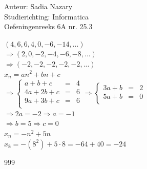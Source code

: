 \documentclass[a4paper]{article}
\begin{document}
  
\noindent \large Auteur: Sadia Nazary\\
\noindent \large Studierichting: Informatica\\
\noindent \large Oefeningenreeks 6A nr. 25.3 \\

\medskip

\normalsize

$(4, 6, 6, 4, 0, -6, -14, ...)$\\

$\Rightarrow (2, 0, -2, -4, -6, -8, ...)$\\

$\Rightarrow (-2, -2, -2, -2, -2, ...)$\\

$x_n = an^2 + bn + c$\\

$\Rightarrow \left\{
    \begin{array}{lcr}
         a +  b + c & = & 4\\
        4a + 2b + c & = & 6\\
        9a + 3b + c & = & 6\\
    \end{array}
\right. \Rightarrow \left\{
    \begin{array}{lcr}
         3a + b & = & 2\\
         5a + b & = & 0\\
    \end{array}
\right.$\\

$\Rightarrow 2a = -2 \Rightarrow a = -1$\\

$\Rightarrow b = 5 \Rightarrow c = 0$\\

$x_n = -n^2 + 5n$\\

$x_8 = -(8^2) + 5 \cdot 8 = -64 + 40 = -24$\\

\begin{thebibliography}{999}
\end{thebibliography}
\end{document}
